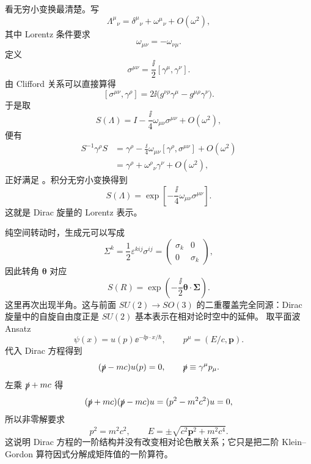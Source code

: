 看无穷小变换最清楚。写
\[
\Lambda^\mu{}_{\nu}
=\delta^\mu{}_{\nu}+\omega^\mu{}_{\nu}+O(\omega^2),
\]
其中 Lorentz 条件要求
\[
\omega_{\mu\nu}=-\omega_{\nu\mu}.
\]
定义
\[
\sigma^{\mu\nu}=\frac{\ii}{2}[\gamma^\mu,\gamma^\nu].
\]
由 Clifford 关系可以直接算得
\begin{equation*}\boxed{
[\sigma^{\mu\nu},\gamma^\rho]
=2\ii\bigl(g^{\nu\rho}\gamma^\mu-g^{\mu\rho}\gamma^\nu\bigr)
}.\end{equation*}
于是取
\[
S(\Lambda)
=I-\frac{\ii}{4}\omega_{\mu\nu}\sigma^{\mu\nu}+O(\omega^2),
\]
便有
\[
\begin{aligned}
S^{-1}\gamma^\rho S
&=\gamma^\rho
-\frac{\ii}{4}\omega_{\mu\nu}[\gamma^\rho,\sigma^{\mu\nu}]+O(\omega^2)\\
&=\gamma^\rho+\omega^\rho{}_{\nu}\gamma^\nu+O(\omega^2),
\end{aligned}
\]
正好满足 。积分无穷小变换得到
\[
\boxed{
S(\Lambda)
=\exp\!\left[-\frac{\ii}{4}\omega_{\mu\nu}\sigma^{\mu\nu}\right]
}.
\]
这就是 Dirac 旋量的 Lorentz 表示。

纯空间转动时，生成元可以写成
\[
\Sigma^k=\frac12\varepsilon^{kij}\sigma^{ij}
=\begin{pmatrix}
\sigma_k&0\\0&\sigma_k
\end{pmatrix},
\]
因此转角 $\boldsymbol\theta$ 对应
\[
S(R)=\exp\!\left(-\frac{\ii}{2}\boldsymbol\theta\cdot\boldsymbol\Sigma\right).
\]
这里再次出现半角。这与前面 $SU(2)\to SO(3)$ 的二重覆盖完全同源：Dirac 旋量中的自旋自由度正是 $SU(2)$ 基本表示在相对论时空中的延伸。
取平面波 Ansatz
\[
\psi(x)=u(p)\ee^{-\ii p\cdot x/\hbar},
\qquad p^\mu=(E/c,\mathbf p).
\]
代入 Dirac 方程得到
\begin{equation}
(\slashed p-mc)u(p)=0,
\qquad
\slashed p\equiv\gamma^\mu p_\mu.
\label{eq:dirac-u-equation}
\end{equation}
左乘 $\slashed p+mc$ 得
\[
(\slashed p+mc)(\slashed p-mc)u
=(p^2-m^2c^2)u=0,
\]
所以非零解要求
\[
p^2=m^2c^2,
\qquad
E=\pm\sqrt{c^2\mathbf p^2+m^2c^4}.
\]
这说明 Dirac 方程的一阶结构并没有改变相对论色散关系；它只是把二阶 Klein--Gordon 算符因式分解成矩阵值的一阶算符。

